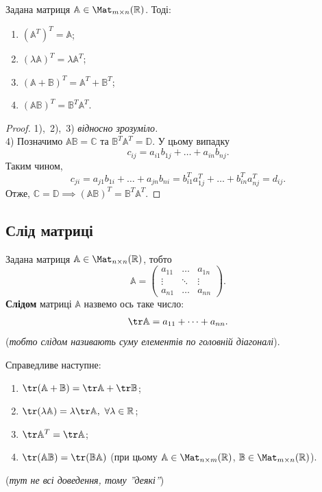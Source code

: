 \documentclass{math_library}
\begin{document}
	\begin{proposition}
	Задана матриця $\mathbb{A} \in \Mat_{m \times n}(\mathbb{R})$. Тоді:
	\begin{enumerate}[nosep, wide=0pt, label={\arabic*)}]
	\item $(\mathbb{A}^T)^T = \mathbb{A}$;
	\item $(\lambda \mathbb{A})^T = \lambda \mathbb{A}^T$;
	\item $(\mathbb{A} + \mathbb{B})^T = \mathbb{A}^T + \mathbb{B}^T$;
	\item $(\mathbb{A} \mathbb{B})^T = \mathbb{B}^T \mathbb{A}^T$.
	\end{enumerate}
	\end{proposition}
	
	\begin{proof}
	1),\ 2),\ 3) \textit{відносно зрозуміло.}\\
	4) Позначимо $\mathbb{A} \mathbb{B} = \mathbb{C}$ та $\mathbb{B}^T \mathbb{A}^T = \mathbb{D}$. У цьому випадку
	\[
	c_{ij} = a_{i1}b_{1j} + \dots + a_{in}b_{nj}.
	\]
	Таким чином, 
	\[
	c_{ji} = a_{j1}b_{1i} + \dots + a_{jn}b_{ni} = b_{i1}^T a_{1j}^T + \dots + b_{in}^T a_{nj}^T = d_{ij}.
	\]
	Отже, $\mathbb{C} = \mathbb{D} \implies (\mathbb{A} \mathbb{B})^T = \mathbb{B}^T \mathbb{A}^T$.
	\end{proof}
	
	\subsection{Слід матриці}
	\begin{definition}
	Задана матриця $\mathbb{A} \in \Mat_{n \times n}(\mathbb{R})$, тобто \[
	\mathbb{A} = \begin{pmatrix}
	a_{11} & \dots & a_{1n} \\
	\vdots & \ddots & \vdots \\
	a_{n1} & \dots & a_{nn}
	\end{pmatrix}.
	\]
	\textbf{Слідом} матриці $\mathbb{A}$ назвемо ось таке число:
	\begin{align*}
	\tr \mathbb{A} = a_{11} + \dots + a_{nn}.
	\end{align*}
	(\textit{тобто слідом називають суму елементів по головній діагоналі}).
	\end{definition}
	
	\begin{proposition}
	Справедливе наступне:
	\begin{enumerate}[nosep,wide=0pt,label={\arabic*)}]
	\item $\tr (\mathbb{A} + \mathbb{B}) = \tr \mathbb{A} + \tr \mathbb{B}$;
	\item $\tr (\lambda \mathbb{A}) = \lambda \tr \mathbb{A},\ \forall \lambda \in \mathbb{R}$;
	\item $\tr \mathbb{A}^T = \tr \mathbb{A}$;
	\item $\tr (\mathbb{A} \mathbb{B}) = \tr (\mathbb{B} \mathbb{A})$ (при цьому $\mathbb{A} \in \Mat_{n \times m}(\mathbb{R})$, $\mathbb{B} \in \Mat_{m \times n}(\mathbb{R})$).
	\end{enumerate}
	(\textit{тут не всі доведення, тому ''деякі''})
	\end{proposition}
	
\end{document}
